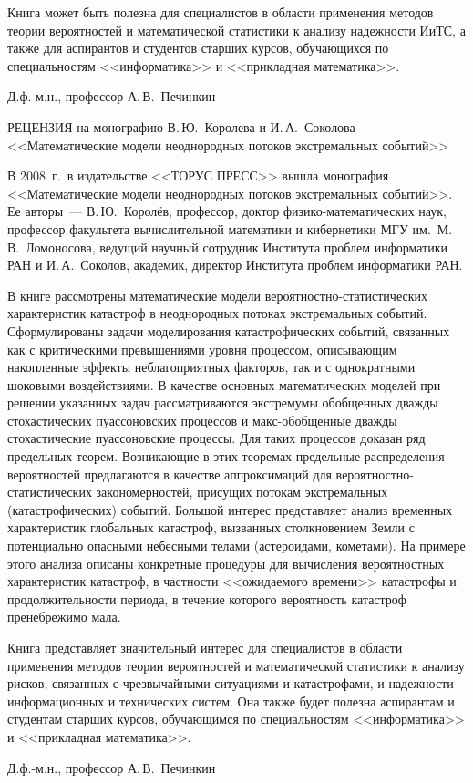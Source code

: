      Книга может быть полезна для специалистов в области применения методов теории 
вероятностей и математической статистики к анализу надежности ИиТС, а также для 
аспирантов и студентов старших курсов, обучающихся по специальностям <<информатика>> и 
<<прикладная математика>>.
     
     
Д.ф.-м.н., профессор							А.\,В.~Печинкин
     
     
     РЕЦЕНЗИЯ
     на монографию В.\,Ю.~Королева и И.\,А.~Соколова
     <<Математические модели неоднородных потоков экстремальных событий>>
     
     В 2008~г.\ в издательстве <<ТОРУС ПРЕСС>> вышла монография <<Математические 
модели неоднородных потоков экстремальных событий>>. Ее авторы~--- В.\,Ю.~Королёв, 
профессор, доктор физико-математических наук, профессор факультета вычислительной 
математики и кибернетики МГУ им.\ М.\,В.~Ломоносова, ведущий научный сотрудник 
Института проблем информатики РАН и И.\,А.~Соколов, академик, директор Института 
проблем информатики РАН. 
     
     В книге рассмотрены математические модели вероятностно-статистических 
характеристик катастроф в неоднородных потоках экстремальных событий. Сформулированы 
задачи моделирования катастрофических событий, связанных как с критическими 
превышениями уровня процессом, описывающим накопленные эффекты неблагоприятных 
факторов, так и с однократными шоковыми воздействиями. В качестве основных 
математических моделей при решении указанных задач рассматриваются экстремумы 
обобщенных дважды стохастических пуассоновских процессов и макс-обобщенные дважды 
стохастические пуассоновские процессы. Для таких процессов доказан ряд предельных теорем. 
Возникающие в этих теоремах предельные распределения вероятностей предлагаются в 
качестве аппроксимаций для вероятностно-статистических закономерностей, присущих 
потокам экстремальных (катастрофических) событий. Большой интерес представляет анализ 
временных характеристик глобальных катастроф, вызванных столкновением Земли с 
потенциально опасными небесными телами (астероидами, кометами). На примере этого 
анализа описаны конкретные процедуры для вычисления вероятностных характеристик 
катастроф, в частности <<ожидаемого времени>> катастрофы и продолжительности периода, в 
течение которого вероятность катастроф пренебрежимо мала.
     
     Книга представляет значительный интерес для специалистов в области применения 
методов теории вероятностей и математической статистики к анализу рисков, связанных с 
чрезвычайными ситуациями и катастрофами, и надежности информационных и технических 
систем. Она также будет полезна аспирантам и студентам старших курсов, обучающимся по 
специальностям <<информатика>> и <<прикладная математика>>. 
     
Д.ф.-м.н., профессор							А.\,В.~Печинкин
     